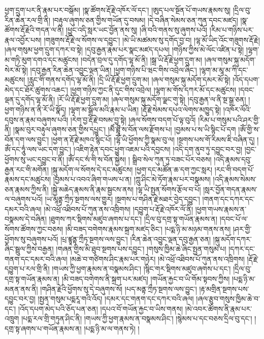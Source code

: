 ཕྱག་དྲུག་པར་ནི་རྣམ་པར་བསྒོམ། །སྣ་ཚོགས་རྡོ་རྗེ་འཁོར་ལོ་དང་། །ཨུད་པལ་སྔོན་པོ་གཡས་རྣམས་སུ། །དྲིལ་བུ་རིན་ཆེན་རལ་གྲི་ནི། །བརྟུལ་ཞུགས་ཅན་གྱིས་གཡོན་དུ་བསམ། །དེ་བཞིན་སེམས་ཅན་ཀུན་དབང་མཛད། །སྣ་ཚོགས་རྡོ་རྗེའི་གདན་ལ་ནི། །ཕྱུང་འདི་སླར་ཡང་བྱོན་ནས་སུ། །ཞི་བའི་གནས་སུ་ཞུགས་པའོ། །རིམ་པ་གཉིས་པར་རྣལ་འབྱོར་པས། །གཟུགས་རྡོ་རྗེ་ལ་སོགས་ལ་དབྱུང་། །མེ་ཡི་མཚམས་སུ་དགོད་བྱ་བ། །ལྷ་མོ་ཡིད་འོང་གཟུགས་རྡོ་རྗེ། །ཞལ་གསུམ་ཕྱག་དྲུག་དཀར་བ་སྟེ། །དབུ་རྒྱན་རྣམ་པར་སྣང་མཛད་དཔལ། །གཉིས་ཀྱིས་མེ་ལོང་འཛིན་པ་སྟེ། །ལྷག་མ་གཏི་མུག་དགའ་དང་མཚུངས། །བདེན་བྲལ་དུ་དགོད་ལྷ་མོ་ནི། །སྒྲ་ཡི་རྡོ་རྗེ་ཕྱག་དྲུག་མ། །ཞལ་གསུམ་སྐུ་མདོག་སེར་མོ་སྟེ། །དབུ་རྒྱན་རིན་ཆེན་འབྱུང་ལྡན་ཡིན། །ཕྱག་གཉིས་པི་ཝང་གིས་འབྲེལ་ཞིང་། །ལྷག་མ་མཱ་མ་ཀི་དང་མཚུངས། །རླུང་གི་གནས་དགོད་ལྷ་མོ་ནི། །དྲི་ཡི་རྡོ་རྗེ་ཕྱག་དྲུག་མ། །ཞལ་གསུམ་སྐུ་མདོག་དམར་མོ་སྟེ། །འོད་དཔག་མེད་དང་ཐོར་ཚུགས་འཆང་། །ཕྱག་གཉིས་ཀྱང་ནི་དུང་གིས་འབྲེལ། །ལྷག་མ་གོས་དཀར་མོ་དང་མཚུངས། །དབང་ལྡན་དུ་དགོད་ལྷ་མོ་ནི། །རོ་ཡི་རྡོ་རྗེ་ཕྱག་དྲུག་མ། །ཞལ་གསུམ་སྐུ་མདོག་ལྗང་གུ་སྟེ། །དབུ་རྒྱན་ལ་ནི་སྔ་སྒྲ་ཅན། །ཕྱག་གཉིས་ན་ནི་རོ་ཡི་སྣོད། །ལྷག་མ་སྒྲོལ་མའི་རྣམ་པ་ཡིན། །རྡོ་རྗེ་སེམས་དཔའ་ལེགས་མཁྱུད་སྟེ། །འཁོར་ལོའི་དབུས་ན་རྣམ་བཞུགས་པའི། །རེག་བྱ་རྡོ་རྗེ་བསམ་བྱ་སྟེ། །ཞལ་སོགས་བདག་པོ་ལྟ་བུའོ། །རིམ་པ་གསུམ་པའི་ཤར་གྱི་ནི། །སྣམ་བུར་བརྟུལ་ཞུགས་ཅན་གྱིས་དཔྱུང་། །མཻཾ་ཐླཱྀཾ་ས་བོན་ལས་རྫོགས་པ། །བྱམས་པ་ས་ཡི་སྙིང་པོ་དག །ཨོཾ་གྱི་ས་བོན་དག་ལས་བྱུང་། །ཕྱག་ན་རྡོ་རྗེ་མཁའ་སྙིང་པོ། །ལྷོ་ཡི་ཕྱོགས་ཀྱི་སྣམ་བུ་ལ། །སྔགས་པས་གོ་རིམས་ཇི་བཞིན་དུ། །ཨོཾ་དང་ཧཱུཾ་ལས་ཡང་དག་བྱུང་། །འཇིག་རྟེན་དབང་ཕྱུག་འཇམ་པའི་དབྱངས། །འདི་དག་ནུབ་ཏུ་དབྱུང་བར་བྱ། །བྱང་ཕྱོགས་སུ་ཡང་དབྱུང་བ་ནི། །ཨོཾ་དང་སཾ་གི་ས་བོན་སྐྱེས། །
སྒྲིབ་སེལ་ཀུན་ཏུ་བཟང་པོར་བཅས། །འདི་རྣམས་དབུ་རྒྱན་རང་གི་མགོན། །སྐུ་མདོག་ལ་སོགས་དེ་དང་མཚུངས། །ཕྱག་དང་མཚོན་ཆ་དག་ཀྱང་སླར། །རང་གི་བདག་པོ་རྣམས་དང་མཚུངས། །བྱམས་པ་འབའ་ཞིག་གཡས་པ་ན། །ཀླུ་ཤིང་མེ་ཏོག་རྣམ་པར་བསྣམས། །འདི་རྣམས་སེམས་ཅན་རྣམས་ཀྱིས་ནི། །སྐྱེ་མཆེད་རྣམས་ནི་རྣམ་སྦྱངས་ནས། །ལྷ་ཡི་སྤྱན་སོགས་རྩོལ་བ་པོ། །སླར་བྱོན་གདན་རྣམས་ལ་བཞུགས་པའོ། །ཡ་མཱནྟ་ཀྲྀཏ་སྔགས་ལས་གྱུར། །སྔགས་པ་གཤིན་རྗེ་མཐར་བྱེད་དབྱུང་། །གནག་དང་དཀར་དང་དམར་བའི་ཞལ། །མེ་འཕྲོ་འཐིབས་པོ་ཀུན་ནས་འཁྲིགས། །དབྱུག་པ་རྡོ་རྗེ་འཁོར་ལོ་ནི། །ཕྱག་གཡས་རྣམས་ན་བསྣམས་དེ་བཞིན། །ཐུགས་ཀར་སྡིགས་མཛུབ་ཞགས་པ་དང་། །དྲིལ་བུ་དགྲ་སྟ་གཡོན་རྣམས་ན། །དབང་པོ་ལ་སོགས་ཚོགས་ཀྱང་བཅས། །མི་བཟད་བགེགས་རྣམས་སྐྲག་མཛད་ཅིང་། །པདྨ་ཉི་མ་མཉམ་གནས་ནས། །ཤར་གྱི་ཕྱོགས་སུ་བཞུགས་པའོ། །པྲ་ཛྙཱནྟ་ཀྲྀཏ་སྔགས་ལས་བྱུང་། །རིན་ཆེན་འབྱུང་ལྡན་དབུ་རྒྱན་ཅན། །སྐུ་མདོག་དཀར་ཞིང་སྦྲུལ་ཀྱིས་བརྒྱན། །གཞན་གྱིས་མི་ཐུབ་སྔགས་པས་དབྱུང་། །གསུས་ཁྱིམ་ཆེ་ཞིང་སྤྱན་གསུམ་པ། །དཀར་དང་གནག་དང་དམར་བའི་ཞལ། །མཆེ་བ་གཙིགས་ཤིང་རྣམ་པར་གཉེར། །མེ་འཕྲོ་འཐིབས་པོ་ཀུན་ནས་འཁྲིགས། །རྡོ་རྗེ་དབྱུག་པ་རལ་གྲི་ནི། །གཡས་ཀྱི་ཕྱག་རྣམས་ན་བསྣམས་ཤིང་། །སྙིང་གར་སྡིགས་མཛུབ་ཞགས་པ་དང་། །དྲིལ་བུ་དགྲ་སྟ་གཡོན་རྣམས་ན། །མི་བཟད་བགེགས་ནི་སྐྲག་པར་མཛད། །གཡོན་རྐྱང་བ་ཡི་གོམ་སྟབས་ཀྱིས། །པདྨ་ཉི་མ་མནན་ནས་ནི། །གཤིན་རྗེའི་ཕྱོགས་སུ་དེ་བཞུགས་སོ། །པད་མནྟ་ཀྲྀཏ་སྔགས་ལས་བྱུང་། །རྟ་མགྲིན་སྔགས་པས་དབྱུང་བར་བྱ། །སྤྱན་གསུམ་པདྨརཱ་གའི་འོད། །དམར་དང་གནག་དང་དཀར་བའི་ཞལ། །ཞལ་རྩུབ་གསུས་ཁྱིམ་ཆེ་བ་དང་། །འོད་དཔག་མེད་པའི་ཅོད་པན་ཅན། །དཔའ་བོ་གཡོན་རྐྱང་བ་ཡིས་གནས། །མེ་འབར་ཚོགས་ནི་རྣམ་པར་འཁྲུག །པདྨ་རལ་གྲི་གཏུན་ཤིང་ནི། །གཡས་ཀྱི་ཕྱག་རྣམས་ན་བསྣམས་ཤིང་། །སྙེམས་པ་དང་བཅས་དྲིལ་བུ་དང་། །དགྲ་སྟ་ཞགས་པ་གཡོན་རྣམས་ན། །པདྨ་ཉི་མ་ལ་གནས་ཏེ། །
